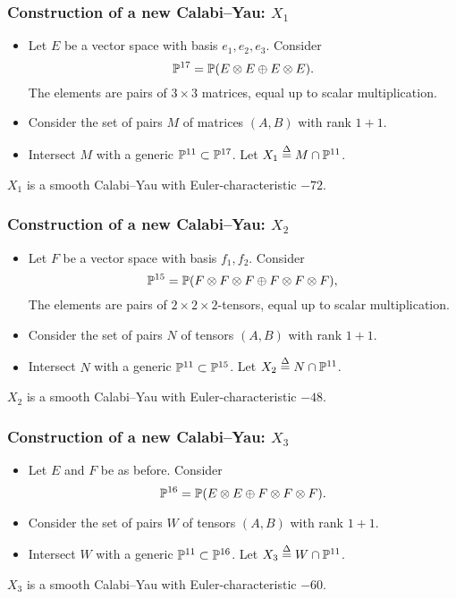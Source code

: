 \begin{frame}
\frametitle{Construction of a new Calabi--Yau: $X_1$}

\begin{itemize}
	\item Let $E$ be a vector space with basis $e_1,e_2,e_3$. Consider
	$$
	\P^{17} = \P(E \otimes E \oplus E \otimes E).
	$$
	The elements are pairs of $3 \times 3$ matrices, equal up to scalar multiplication.
	\item Consider the set of pairs $M$ of matrices $(A,B)$ with rank $1+1$. 
	\item Intersect $M$ with a generic $\P^{11} \subset \P^{17}$. Let $X_1 \stackrel \Delta = M \cap \P^{11}$.
\end{itemize}

\begin{theorem}
$X_1$ is a smooth Calabi--Yau with Euler-characteristic $-72$.
\end{theorem}

\end{frame}


\begin{frame}
\frametitle{Construction of a new Calabi--Yau: $X_2$}

\begin{itemize}
	\item Let $F$ be a vector space with basis $f_1,f_2$. Consider
	$$
\P^{15} = \P(F \otimes F \otimes F \oplus F \otimes F \otimes F),
	$$
	The elements are pairs of $2 \times 2 \times 2$-tensors, equal up to scalar multiplication.
	\item Consider the set of pairs $N$ of tensors $(A,B)$ with rank $1+1$.
	\item Intersect $N$ with a generic $\P^{11} \subset \P^{15}$. Let $X_2 \stackrel \Delta = N \cap \P^{11}$.
\end{itemize}

\begin{theorem}
$X_2$ is a smooth Calabi--Yau with Euler-characteristic $-48$.
\end{theorem}

\end{frame}

\begin{frame}
\frametitle{Construction of a new Calabi--Yau: $X_3$}

\begin{itemize}
	\item Let $E$ and $F$ be as before. Consider
	$$
\P^{16} = \P(E \otimes E \oplus F \otimes F \otimes F).
	$$
	\item Consider the set of pairs $W$ of tensors $(A,B)$ with rank $1+1$.
	\item Intersect $W$ with a generic $\P^{11} \subset \P^{16}$. Let $X_3 \stackrel \Delta =  W \cap \P^{11}$.
\end{itemize}

\begin{theorem}
$X_3$ is a smooth Calabi--Yau with Euler-characteristic $-60$.
\end{theorem}

\end{frame}

